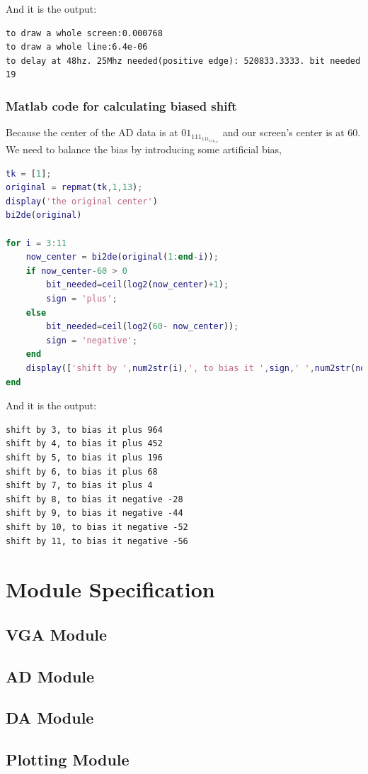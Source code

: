 \documentclass[11pt]{scrartcl}
\begin{document}
And it is the output:
\begin{verbatim}
to draw a whole screen:0.000768
to draw a whole line:6.4e-06
to delay at 48hz. 25Mhz needed(positive edge): 520833.3333. bit needed 19
\end{verbatim}
\subsubsection{Matlab code for calculating biased shift}

Because the center of the AD data is at $01_111_111_111_111$ and our screen's center is at 60. We need to balance the bias by introducing some artificial bias, 
\begin{lstlisting}[language=Matlab]
tk = [1];
original = repmat(tk,1,13);
display('the original center')
bi2de(original)

for i = 3:11
    now_center = bi2de(original(1:end-i));
    if now_center-60 > 0
        bit_needed=ceil(log2(now_center)+1);
        sign = 'plus';
    else
        bit_needed=ceil(log2(60- now_center));
        sign = 'negative';
    end
    display(['shift by ',num2str(i),', to bias it ',sign,' ',num2str(now_center-59)])
end
\end{lstlisting}
And it is the output:
\begin{verbatim}
shift by 3, to bias it plus 964
shift by 4, to bias it plus 452
shift by 5, to bias it plus 196
shift by 6, to bias it plus 68
shift by 7, to bias it plus 4
shift by 8, to bias it negative -28
shift by 9, to bias it negative -44
shift by 10, to bias it negative -52
shift by 11, to bias it negative -56
\end{verbatim}





\section{Module Specification}
\subsection{VGA Module}
\subsection{AD Module}
\subsection{DA Module}
\subsection{Plotting Module}
\end{document}
